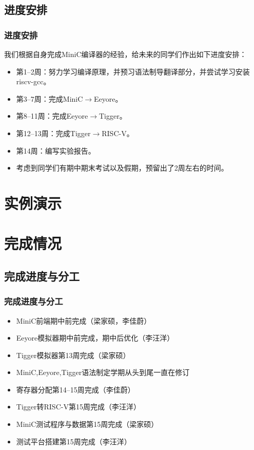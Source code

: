 \documentclass{beamer}
\begin{document}
\subsection{进度安排}

\begin{frame}
    \frametitle{进度安排}
    我们根据自身完成MiniC编译器的经验，给未来的同学们作出如下进度安排：
    \begin{itemize}
        \item 第1--2周：努力学习编译原理，并预习语法制导翻译部分，并尝试学习安装riscv-gcc。

        \item 第3--7周：完成MiniC$\rightarrow$Eeyore。

        \item 第8--11周：完成Eeyore$\rightarrow$Tigger。

        \item 第12--13周：完成Tigger$\rightarrow$RISC-V。

        \item 第14周：编写实验报告。

        \item 考虑到同学们有期中期末考试以及假期，预留出了2周左右的时间。
    \end{itemize}
\end{frame}

\section{实例演示}


\section{完成情况}

\subsection{完成进度与分工}

\begin{frame}
    \frametitle{完成进度与分工}
    \begin{itemize}
        \item MiniC前端\qquad\qquad 期中前完成（梁家硕，李佳蔚）
        \item Eeyore模拟器\qquad\qquad 期中前完成，期中后优化（李汪洋）
        \item Tigger模拟器\qquad\qquad 第13周完成（梁家硕）
        \item MiniC,Eeyore,Tigger语法制定\qquad 学期从头到尾一直在修订
        \item 寄存器分配\qquad\qquad 第14--15周完成（李佳蔚）
        \item Tigger转RISC-V\qquad\qquad 第15周完成（李汪洋）
        \item MiniC测试程序与数据\qquad 第15周完成（梁家硕）
        \item 测试平台搭建\qquad\qquad 第15周完成（李汪洋）
    \end{itemize}
\end{frame}
\end{document}
